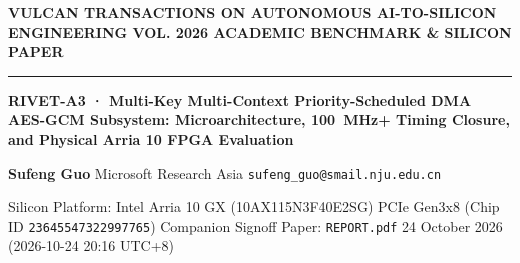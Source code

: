 \documentclass[11pt,a4paper]{article}
\begin{document}
{\scriptsize\sffamily\textcolor{vulcan}{\textbf{VULCAN TRANSACTIONS ON AUTONOMOUS AI-TO-SILICON ENGINEERING \hfill VOL. 2026 \textperiodcentered{} ACADEMIC BENCHMARK \& SILICON PAPER}}\par}

\vspace{1pt}\textcolor{vulcan}{\rule{\textwidth}{1.2pt}}\vspace{3pt}

\begin{center}

{\sffamily\LARGE\bfseries RIVET-A3 · Multi-Key Multi-Context Priority-Scheduled DMA AES-GCM Subsystem: Microarchitecture, 100~MHz+ Timing Closure, and Physical Arria 10 FPGA Evaluation\par}\vspace{3pt}

{\small\sffamily\textbf{Sufeng Guo} \textperiodcentered{} Microsoft Research Asia \textperiodcentered{} \texttt{sufeng\_guo@smail.nju.edu.cn}\par}\vspace{1pt}

{\scriptsize\sffamily\textcolor{black!75}{Silicon Platform: Intel Arria 10 GX (\allowbreak{}10AX115N3F40E2SG)\allowbreak{} PCIe Gen3x8 (Chip ID \texttt{23645547322997765}) \textperiodcentered{} Companion Signoff Paper: \texttt{REPORT.pdf} \textperiodcentered{} 24 October 2026 (\allowbreak{}2026-10-24 20:16 UTC+\allowbreak{}8)\allowbreak{}}\par}

\end{center}\vspace{2pt}
\end{document}
